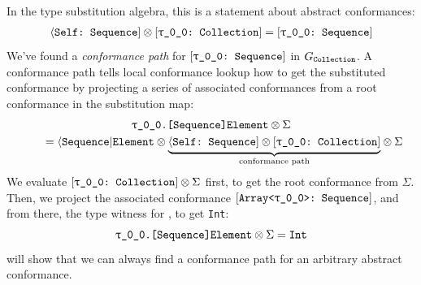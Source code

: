 \documentclass[../generics]{subfiles}
\begin{document}
\begin{example}
In the type substitution algebra, this is a statement about abstract conformances:
\begin{gather*}
\SelfSequence \otimes \rTCollection = \rTSequence
\end{gather*}
We've found a \emph{conformance path} for $\rTSequence$ in $G_{\texttt{Collection}}$. A conformance path tells local conformance lookup how to get the substituted conformance by projecting a series of associated conformances from a root conformance in the substitution map:
\begin{gather*}
\texttt{\rT.[Sequence]Element} \otimes \Sigma \\
\qquad {} = \AElement \otimes {\underbrace{\SelfSequence \otimes \rTCollection\strut}_{\text{conformance path}}} \otimes \Sigma
\end{gather*}
We evaluate $\rTCollection \otimes \Sigma$ first, to get the root conformance from $\Sigma$. Then, we project the associated conformance $\ConfReq{Array<\rT>}{Sequence}$, and from there, the type witness for \nElement, to get \texttt{Int}:
\[\texttt{\rT.[Sequence]Element} \otimes \Sigma = \texttt{Int}\]
 will show that we can always find a conformance path for an arbitrary abstract conformance.
\end{example}
\end{document}
